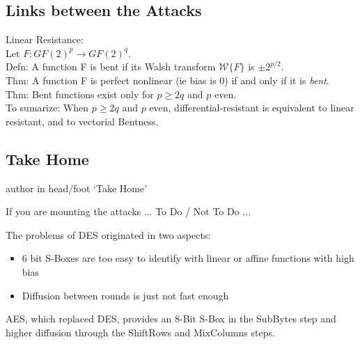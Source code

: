 \documentclass[9pt]{beamer}
\begin{document}
\subsection{Links between the Attacks}
\begin{frame}
Linear Resistance:\\
\vspace{3mm}
Let $F: GF(2)^p \rightarrow GF(2)^q$.\\
\vspace{3mm}
Defn: A function F is bent if its Walsh transform $\mathcal{W}\{F\}$ is $\pm 2^{p/2}$.\\
\vspace{3mm}
Thm: A function F is perfect nonlinear (ie bias is 0) if and only if it is \textit{bent}. \\
\vspace{3mm}
Thm: Bent functions exist only for $p \geq 2q$ and $p$ even. \\
\vspace{5mm}
To sumarize: When $p\geq 2q$ and $p$ even, differential-resistant is equivalent to linear resistant, and to vectorial Bentness.
\end{frame}

\subsection{Take Home}
\begin{frame}
\begin{beamercolorbox}[ht=2.5ex,dp=1.125ex,center,rounded=true,shadow=true]{author in head/foot}
`Take Home'
\end{beamercolorbox}
\end{frame}

\begin{frame}
If you are mounting the attacks ... To Do / Not To Do ...

\end{frame}

\begin{frame}
The problems of DES originated in two aspects:
\begin{itemize}
\item{6 bit S-Boxes are too easy to identify with linear or affine functions with high bias}
\item{Diffusion between rounds is just not fast enough}
\end{itemize}
AES, which replaced DES, provides an 8-Bit S-Box in the SubBytes step and higher diffusion through the ShiftRows and MixColumns steps. 
\end{frame}
\end{document}
